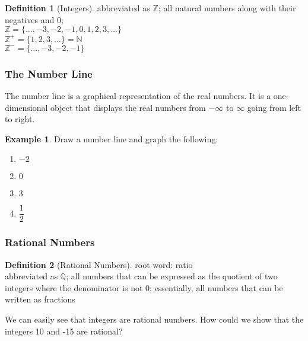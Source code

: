 \documentclass[addpoints,12pt]{exam}
\theoremstyle{definition}
\newtheorem{example}{Example}[subsection]
\newtheorem{definition}{Definition}[subsection]
\begin{document}
\begin{definition}[Integers]
abbreviated as $\mathbb{Z}$; all natural numbers along with their negatives and 0;\\
$\mathbb{Z} = \{\dots,-3,-2,-1,0,1,2,3,\dots\}$\\
$\mathbb{Z}^+ = \{1,2,3,\dots\} = \mathbb{N}$\\
$\mathbb{Z}^- = \{\dots,-3,-2,-1\}$
\end{definition}
\vspace{.25in}

\subsubsection*{The Number Line}
\noindent The number line is a graphical representation of the real numbers. It is a one-dimensional object that displays the real numbers from $-\infty$ to $\infty$ going from left to right.

\begin{example}
Draw a number line and graph the following:
\vspace{.5in}

\begin{enumerate}
\item $-2$
\item $0$
\item $3$
\item $\dfrac{1}{2}$
\end{enumerate}
\end{example}

\subsubsection*{Rational Numbers}

\begin{definition}[Rational Numbers]
root word: ratio\\
abbreviated as $\mathbb{Q}$; all numbers that can be expressed as the quotient of two integers where the denominator is not 0; essentially, all numbers that can be written as fractions
\end{definition}

\vspace{.25in}

\noindent We can easily see that integers are rational numbers. How could we show that the integers 10 and -15 are rational?

\vspace{1in}
\end{document}
